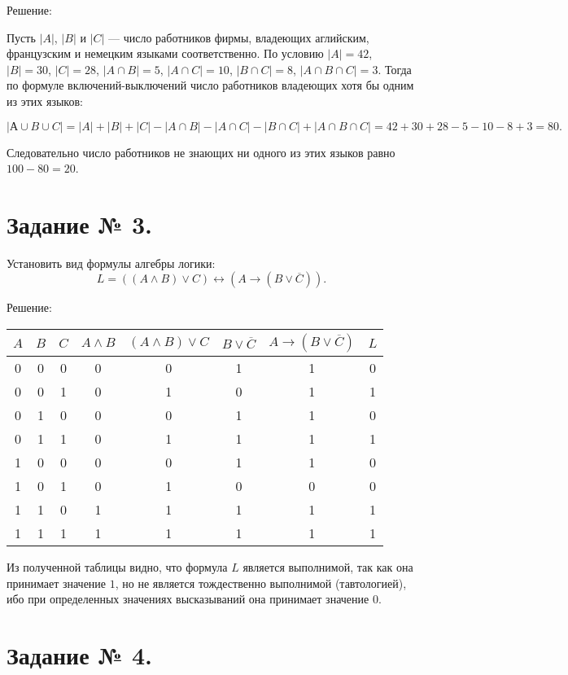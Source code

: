 \documentclass[fleqn]{article}
\begin{document}
\begin{center}Решение:\end{center}

Пусть $|A|$, $|B|$ и $|C|$ --- число работников фирмы, владеющих аглийским, французским и немецким языками соответственно. По условию $|A|=42$, $|B|=30$, $|C|=28$, $|A\cap B|=5$, $|A\cap C|=10$, $|B\cap C|=8$, $|A\cap B\cap C|=3$. Тогда по формуле включений-выключений число работников владеющих хотя бы одним из этих языков:

$$|А\cup B\cup C|=|A|+|B|+|C|-|A\cap B|-|A\cap C|-|B\cap C|+|A\cap B\cap C|=42+30+28-5-10-8+3=80.$$

Следовательно число работников не знающих ни одного из этих языков равно $100-80=20$.

\section*{Задание № 3.}

Установить вид формулы алгебры логики:
$$L = ((A \wedge B) \vee C) \leftrightarrow (A \to (B \vee \overline{C} )).$$

\begin{center}Решение:\end{center}

\medskip
\begin{tabular}{|c|c|c|c|c|c|c|c|}
\hline
$A$ & $B$ & $C$ & $A \wedge B$ & $(A \wedge B) \vee C$ & $B \vee \overline{C}$ & $A\to(B\vee\overline{C})$ & $L$ \\
\hline
0 & 0 & 0 & 0 & 0 & 1 & 1 & 0 \\
\hline
0 & 0 & 1 & 0 & 1 & 0 & 1 & 1 \\
\hline
0 & 1 & 0 & 0 & 0 & 1 & 1 & 0 \\
\hline
0 & 1 & 1 & 0 & 1 & 1 & 1 & 1 \\
\hline
1 & 0 & 0 & 0 & 0 & 1 & 1 & 0 \\
\hline
1 & 0 & 1 & 0 & 1 & 0 & 0 & 0 \\
\hline
1 & 1 & 0 & 1 & 1 & 1 & 1 & 1 \\
\hline
1 & 1 & 1 & 1 & 1 & 1 & 1 & 1 \\
\hline
\end{tabular}
\medskip

Из полученной таблицы видно, что формула $L$ является выполнимой, так как она принимает значение $1$, но не является тождественно выполнимой (тавтологией), ибо при определенных значениях высказываний она принимает значение $0$.

\section*{Задание № 4.}
\end{document}
